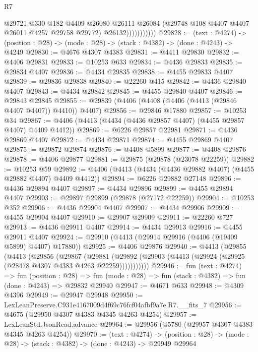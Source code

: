 \begin{lexlean}{R7}
\begin{coremodule}
                        @29721
                          @330
                          @182
                          @4409
                          @26080
                          @26111
                          @26084
                          (@29748 @108 @4407 @4407 @26011 @4257 @29758 @29772)
                          @26132)))))))))))
@29828 := (text : @4274) ->
  (position : @28) -> (mode : @28) -> (stack : @4382) -> (done : @4243) -> @4249
@29830 := @4676 @4307 @4383
@29831 := @4411 @29830
@29832 := @4406 @29831
@29833 := @10253 @633
@29834 := @4436 @29833
@29835 := @29834 @4407
@29836 := @4434 @29835
@29838 := @4455 @29833 @4407
@29839 := @29836 @29838
@29840 := @22260 @415
@29842 := @4436 @29840 @4407
@29843 := @4434 @29842
@29845 := @4455 @29840 @4407
@29846 := @29843 @29845
@29855 := @29839 (@4406 (@4408 (@4406 (@4413 (@29846 @4407 @4407)) @4410)) @4407)
@29856 := @29846 @17880
@29857 := @10253 @34
@29867 := @4406 (@4413 (@4434 (@4436 @29857 @4407) (@4455 @29857 @4407) @4409 @4412))
@29869 := @6226 @29857 @22981
@29871 := @4436 @29869 @4407
@29872 := @4434 @29871
@29874 := @4455 @29869 @4407
@29875 := @29872 @29874
@29876 := @4408 @5899
@29877 := @4408 @29876
@29878 := @4406 @29877
@29881 := @29875 (@29878 (@23078 @22259))
@29882 := @10253 @59
@29892 := @4406 (@4413 (@4434 (@4436 @29882 @4407) (@4455 @29882 @4407) @4409 @4412))
@29894 := @6226 @29882 @27148
@29896 := @4436 @29894 @4407
@29897 := @4434 @29896
@29899 := @4455 @29894 @4407
@29903 := @29897 @29899 (@29878 (@27172 @22259))
@29904 := @10253 @352
@29906 := @4436 @29904 @4407
@29907 := @4434 @29906
@29909 := @4455 @29904 @4407
@29910 := @29907 @29909
@29911 := @22260 @727
@29913 := @4436 @29911 @4407
@29914 := @4434 @29913
@29916 := @4455 @29911 @4407
@29924 := @29910 (@4413 (@29914 @29916 (@4406 (@19409 @5899) @4407) @17880))
@29925 := @4406 @29876
@29940 := @4413
    (@29855
      (@4413
        (@29856
          (@29867
            (@29881
              (@29892 (@29903 (@4413 (@29924 (@29925 (@28478 @4307 @4383 @4263 @22259)))))))))))
@29946 := fun (text : @4274) =>
  fun (position : @28) =>
  fun (mode : @28) => fun (stack : @4382) => fun (done : @4243) => @29832 @29940
@29947 := @4671 @633
@29948 := @4309 @4396
@29949 := @29947 @29948
@29950 := LexLeanPreserve.C931e4167009d4f69c76fcf04afbf9a7e.R7.__fits_7
@29956 := @4675 (@29950 @4307 @4383 @4345 @4263 @4254)
@29957 := LexLeanStd.JsonRead.advance
@29964 := @29956 (@5780 (@29957 @4307 @4383 @4345 @4263 @4254))
@29970 := (text : @4274) ->
  (position : @28) -> (mode : @28) -> (stack : @4382) -> (done : @4243) -> @29949 @29964

\end{coremodule}
\end{lexlean}
